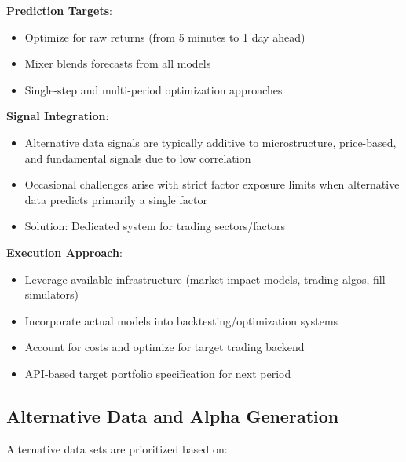 \documentclass[11pt, letterpaper]{article}
\begin{document}
  \textbf{Prediction Targets}:

  \begin{itemize}
    \item Optimize for raw returns (from 5 minutes to 1 day ahead)

    \item Mixer blends forecasts from all models

    \item Single-step and multi-period optimization approaches
  \end{itemize}

  \textbf{Signal Integration}:

  \begin{itemize}
    \item Alternative data signals are typically additive to microstructure,
      price-based, and fundamental signals due to low correlation

    \item Occasional challenges arise with strict factor exposure limits
      when alternative data predicts primarily a single factor

    \item Solution: Dedicated system for trading sectors/factors
  \end{itemize}

  \textbf{Execution Approach}:

  \begin{itemize}
    \item Leverage available infrastructure (market impact models, trading
      algos, fill simulators)

    \item Incorporate actual models into backtesting/optimization systems

    \item Account for costs and optimize for target trading backend

    \item API-based target portfolio specification for next period
  \end{itemize}

  \subsection{Alternative Data and Alpha Generation}
  \label{alternative-data-and-alpha-generation}

  Alternative data sets are prioritized based on:
\end{document}
